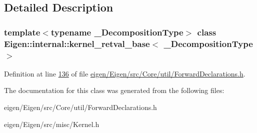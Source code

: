 \subsection{Detailed Description}
\subsubsection*{template$<$typename \+\_\+\+Decomposition\+Type$>$\newline
class Eigen\+::internal\+::kernel\+\_\+retval\+\_\+base$<$ \+\_\+\+Decomposition\+Type $>$}



Definition at line \hyperlink{eigen_2_eigen_2src_2_core_2util_2_forward_declarations_8h_source_l00136}{136} of file \hyperlink{eigen_2_eigen_2src_2_core_2util_2_forward_declarations_8h_source}{eigen/\+Eigen/src/\+Core/util/\+Forward\+Declarations.\+h}.



The documentation for this class was generated from the following files\+:\begin{DoxyCompactItemize}
\item 
eigen/\+Eigen/src/\+Core/util/\+Forward\+Declarations.\+h\item 
eigen/\+Eigen/src/misc/\+Kernel.\+h\end{DoxyCompactItemize}
